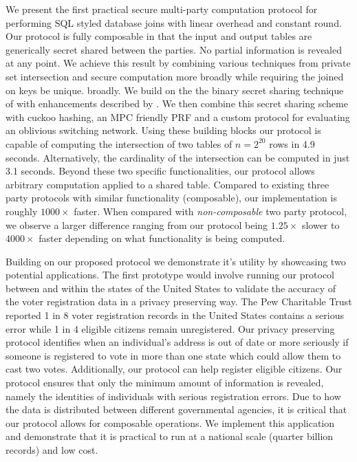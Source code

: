 We present the first practical secure multi-party computation protocol for performing SQL styled database joins with linear overhead and constant round. Our protocol is fully composable in that the input and output tables are generically secret shared between the parties. 
\iffullversion
	No partial information is revealed at any point. 
\fi
	We achieve this result by combining various techniques from private set intersection and secure computation more 
\iffullversion 
	broadly while requiring the joined on keys be unique.
\else
	broadly.
\fi
 We build on the the binary secret sharing technique of \cite{highthroughput} with enhancements described by \cite{aby3}. We then combine this secret sharing scheme with cuckoo hashing\cite{usenix:PSZ14}, an MPC friendly PRF\cite{lowmc} and a custom protocol for evaluating an oblivious switching network\cite{MS13}. Using these building blocks our protocol is capable of computing the intersection of two tables of $n=2^{20}$ rows in 4.9 seconds. 
\iffullversion 
	Alternatively, the cardinality of the intersection can be computed in just 3.1 seconds.
\fi
  Beyond these two specific functionalities, our protocol allows arbitrary computation applied to a shared table. Compared to existing three party protocols with similar functionality (composable), our implementation is roughly $1000\times$ faster. When compared with \emph{non-composable} two party protocol, we observe a larger difference ranging from our protocol being $1.25\times$ slower to $4000\times$ faster depending on what functionality is being computed. 


Building on our proposed protocol we demonstrate it's utility by showcasing two potential applications. The first prototype would involve running our protocol between and within the states of the United States to validate the accuracy of the voter registration data in a privacy preserving way. The Pew Charitable Trust\cite{pew} reported 1 in 8 voter registration records in the United States contains a serious error while 1 in 4 eligible citizens remain unregistered. Our privacy preserving protocol identifies when an individual's address is out of date or more seriously if someone is registered to vote in more than one state which could allow them to cast two votes. 
\iffullversion
Additionally, our protocol can help register eligible citizens. Our protocol ensures that only the minimum amount of information is revealed, namely the identities of individuals with serious registration errors.
\fi 
Due to how the data is distributed between different governmental agencies, it is critical that our protocol allows for composable operations. We implement this application and demonstrate that it is practical to run at a national scale (quarter billion records) and low cost.

